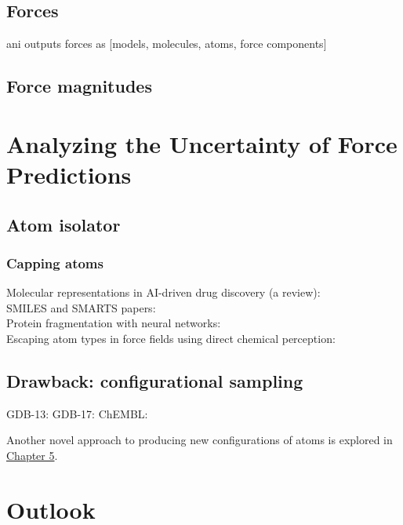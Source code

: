 \subsection{Forces}

ani outputs forces as [models, molecules, atoms, force components]


\subsection{Force magnitudes}

\section{Analyzing the Uncertainty of Force Predictions}

\subsection{Atom isolator}
\subsubsection{Capping atoms}

Molecular representations in AI-driven drug discovery (a review): \cite{mol_reps_in_AI_drug_discovery_david}\\
SMILES and SMARTS papers: \cite{SMILES_pair_encoding_li, mol_patterns_SMARTS_schmidt, automated_fragment_gen_smiles_bilsland}\\
Protein fragmentation with neural networks: \cite{protein_ff_fragmentation_nn_wang}\\
Escaping atom types in force fields using direct chemical perception: \cite{direct_chem_perception_mobley} \\

\subsection{Drawback: configurational sampling}

GDB-13: \cite{gdb-13}
GDB-17: \cite{gdb-17}
ChEMBL: \cite{ChEMBL_gaulton}

Another novel approach to producing new configurations of atoms is explored in \hyperlink{configurational_sampling}{Chapter 5}.

\section{Outlook}